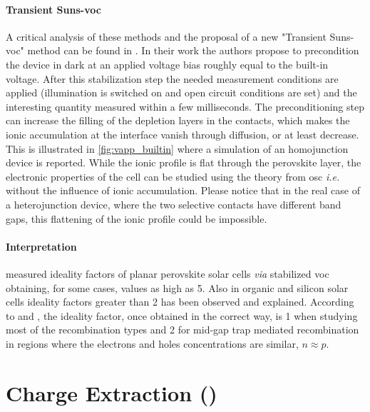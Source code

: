 		\paragraph{Transient Suns-\gls{voc}}\label{transient_suns_voc}
		A critical analysis of these methods and the proposal of a new "Transient Suns-\gls{voc}" method can be found in .
		In their work the authors propose to precondition the device in dark at an applied voltage bias roughly equal to the built-in voltage.
		After this stabilization step the needed measurement conditions are applied (illumination is switched on and open circuit conditions are set) and the interesting quantity measured within a few milliseconds.
		The preconditioning step can increase the filling of the depletion layers in the contacts, which makes the ionic accumulation at the interface vanish through diffusion, or at least decrease.
		This is illustrated in \cref{fig:vapp_builtin} where a simulation of an homojunction device is reported.
		While the ionic profile is flat through the perovskite layer, the electronic properties of the cell can be studied using the theory from \gls{osc} \textsl{i.e.} without the influence of ionic accumulation.
		Please notice that in the real case of a heterojunction device, where the two selective contacts have different band gaps, this flattening of the ionic profile could be impossible.

		\paragraph{Interpretation} %
		 measured ideality factors of planar perovskite solar cells \textsl{via} stabilized \gls{voc} obtaining, for some cases, values as high as 5.
		Also in organic \cite{Kirchartz2011,Kirchartz2012} and silicon solar cells \cite{Breitenstein2006} ideality factors greater than 2 has been observed and explained.
		According to  and , the ideality factor, once obtained in the correct way, is 1 when studying most of the recombination types and 2 for mid-gap trap mediated recombination in regions where the electrons and holes concentrations are similar, $n \approx p$.

\FloatBarrier
\newpage
\section{Charge Extraction ()}

